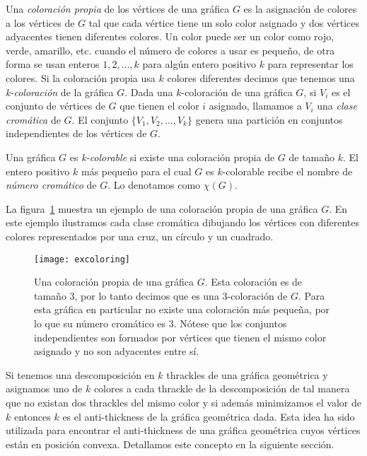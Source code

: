 Una \emph{coloración propia} de los vértices de una gráfica $G$ es la asignación
de colores a los vértices de $G$ tal que cada vértice tiene un solo color
asignado y dos vértices adyacentes tienen diferentes colores.
Un color puede ser un color como rojo, verde, amarillo, etc. cuando el número
de colores a usar es pequeño, de otra forma se usan enteros $1,2,\dots,k$
para algún entero positivo $k$ para representar los colores. Si la coloración
propia usa $k$ colores diferentes decimos que tenemos una \emph{k-coloración}
de la gráfica $G$. Dada una $k$-coloración de una gráfica $G$, si $V_i$ es el
conjunto de vértices de $G$ que tienen el color $i$ asignado, llamamos a $V_i$
una \emph{clase cromática} de $G$. El conjunto $\{V_1,V_2,\dots,V_k\}$ genera
una partición en conjuntos independientes de los vértices de $G$.

Una gráfica $G$ es \emph{k-colorable} si existe una coloración propia de $G$ de
tamaño $k$. El entero positivo $k$ más pequeño para el cual $G$ es
$k$-colorable recibe el nombre de \emph{número cromático} de $G$. Lo denotamos
como $\chi(G)$.


La figura~\ref{fig:excoloring} muestra un ejemplo de una coloración propia de
una gráfica $G$. En este ejemplo ilustramos cada clase cromática dibujando los
vértices con diferentes colores representados por una cruz, un círculo y un
cuadrado.
\begin{figure}[htpb]
  \centering
  \texttt{[image: excoloring]}
  \caption{Una coloración propia de una gráfica $G$. Esta coloración es de
  tamaño 3, por lo tanto decimos que es una 3-coloración de $G$. Para esta
  gráfica en particular no existe una coloración más pequeña, por lo que su
  número cromático es 3. Nótese que los conjuntos independientes son formados
  por vértices que tienen el mismo color asignado y no son adyacentes entre sí.}
  \label{fig:excoloring}
\end{figure}
Si tenemos una descomposición en $k$ thrackles de una gráfica geométrica y
asignamos uno de $k$ colores a cada thrackle de la descomposición de tal
manera que no existan dos thrackles del mismo color y si además minimizamos
el valor de $k$ entonces $k$ es el anti-thickness de la gráfica geométrica dada.
Esta idea ha sido utilizada para encontrar el anti-thickness de una gráfica
geométrica cuyos vértices están en posición convexa. Detallamos este concepto en
la siguiente sección.

